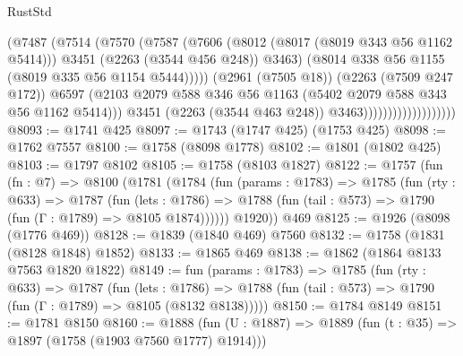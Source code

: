 \begin{lexlean}{RustStd}
\begin{coremodule}
                                          (@7487
                                            (@7514
                                              (@7570
                                                (@7587
                                                  (@7606
                                                    (@8012 (@8017 (@8019 @343 @56 @1162 @5414)))
                                                    @3451
                                                    (@2263 (@3544 @456 @248))
                                                    @3463)
                                                  (@8014
                                                    @338
                                                    @56
                                                    @1155
                                                    (@8019 @335 @56 @1154 @5444)))))
                                            (@2961 (@7505 @18))
                                            (@2263 (@7509 @247 @172))
                                            @6597
                                            (@2103
                                              @2079
                                              @588
                                              @346
                                              @56
                                              @1163
                                              (@5402 @2079 @588 @343 @56 @1162 @5414)))
                                          @3451
                                          (@2263 (@3544 @463 @248))
                                          @3463)))))))))))))))))))
@8093 := @1741 @425
@8097 := @1743 (@1747 @425) (@1753 @425)
@8098 := @1762 @7557
@8100 := @1758 (@8098 @1778)
@8102 := @1801 (@1802 @425)
@8103 := @1797 @8102
@8105 := @1758 (@8103 @1827)
@8122 := @1757
    (fun (fn : @7) =>
    @8100
      (@1781
        (@1784
          (fun (params : @1783) =>
          @1785
            (fun (rty : @633) =>
            @1787
              (fun (lets : @1786) =>
              @1788 (fun (tail : @573) => @1790 (fun (Γ : @1789) => @8105 @1874))))))
        @1920))
    @469
@8125 := @1926 (@8098 (@1776 @469))
@8128 := @1839 (@1840 @469) @7560
@8132 := @1758 (@1831 (@8128 @1848) @1852)
@8133 := @1865 @469
@8138 := @1862 (@1864 @8133 @7563 @1820 @1822)
@8149 := fun (params : @1783) =>
  @1785
    (fun (rty : @633) =>
    @1787
      (fun (lets : @1786) =>
      @1788 (fun (tail : @573) => @1790 (fun (Γ : @1789) => @8105 (@8132 @8138)))))
@8150 := @1784 @8149
@8151 := @1781 @8150
@8160 := @1888 (fun (U : @1887) => @1889 (fun (t : @35) => @1897 (@1758 (@1903 @7560 @1777) @1914)))

\end{coremodule}
\end{lexlean}
